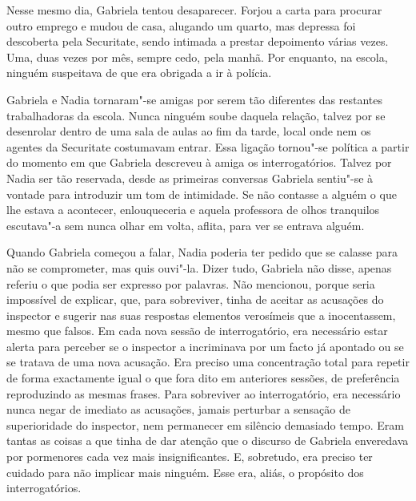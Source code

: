 Nesse mesmo dia, Gabriela tentou desaparecer. Forjou a carta para
procurar outro emprego e mudou de casa, alugando um quarto, mas depressa
foi descoberta pela Securitate, sendo intimada a prestar depoimento
várias vezes. Uma, duas vezes por mês, sempre cedo, pela manhã. Por
enquanto, na escola, ninguém suspeitava de que era obrigada a ir à
polícia.

Gabriela e Nadia tornaram"-se amigas por serem tão diferentes das
restantes trabalhadoras da escola. Nunca ninguém soube daquela relação,
talvez por se desenrolar dentro de uma sala de aulas ao fim da tarde,
local onde nem os agentes da Securitate costumavam entrar. Essa ligação
tornou"-se política a partir do momento em que Gabriela descreveu à amiga
os interrogatórios. Talvez por Nadia ser tão reservada, desde as
primeiras conversas Gabriela sentiu"-se à vontade para introduzir um tom de intimidade. Se não contasse a
alguém o que lhe estava a acontecer, enlouqueceria e aquela professora
de olhos tranquilos escutava"-a sem nunca olhar em volta, aflita, para
ver se entrava alguém.

Quando Gabriela começou a falar, Nadia poderia ter pedido que se calasse
para não se comprometer, mas quis ouvi"-la. Dizer tudo, Gabriela não
disse, apenas referiu o que
podia ser expresso por palavras. Não mencionou, porque seria impossível
de explicar, que, para sobreviver, tinha de aceitar as acusações do
inspector e sugerir nas suas respostas elementos verosímeis que a
inocentassem, mesmo que falsos. Em cada nova sessão de interrogatório,
era necessário estar alerta para perceber se o inspector a incriminava
por um facto já apontado ou se se tratava de uma nova acusação. Era
preciso uma concentração total para repetir de forma exactamente igual o
que fora dito em anteriores sessões, de preferência reproduzindo as
mesmas frases. Para sobreviver ao interrogatório, era necessário nunca
negar de imediato as acusações, jamais perturbar a sensação de
superioridade do inspector, nem permanecer em silêncio demasiado tempo.
Eram tantas as coisas a que tinha de dar atenção que o discurso de
Gabriela enveredava por pormenores cada vez mais insignificantes. E,
sobretudo, era preciso ter cuidado para não implicar mais ninguém.
Esse era, aliás, o propósito dos interrogatórios.

